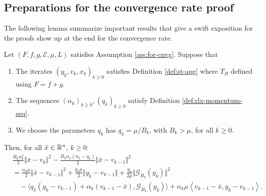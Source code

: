 \documentclass[12pt]{article}
\begin{document}
    \subsection{Preparations for the convergence rate proof}
        The following lemma summarize important results that give a swift exposition for the proofs show up at the end for the convergence rate. 
        \begin{lemma}\label{lemma:cnvg-prep-part1}
            Let $(F, f, g,  \mathcal E, \mu, L)$ satisfies Assumption \ref{ass:for-cnvg}. 
            Suppose that 
            \begin{enumerate}[nosep]
                \item The iterates $(y_k, v_k, x_k)_{k \ge 0}$ satisfies Definition \ref{def:st-apg} where $T_B$ defined using $F = f + g$. 
                \item The sequences $(\alpha_k)_{k\ge 0}, (q_k)_{k \ge 0}$ satisfy Definition \ref{def:rlx-momentum-seq}. 
                \item We choose the parameters $q_k$ has $q_k = \mu/B_k$, with $B_k > \mu$, for all $k \ge 0$. 
            \end{enumerate}
            Then, for all $\bar x \in \mathbb R^n$, $k \ge 0$: 
            \begin{align*}
                & \frac{B_k\alpha_k^2}{2}\Vert \bar x - v_k\Vert^2 
                - \frac{B_k\alpha_k(\alpha_k - q_k)}{2}\Vert \bar x - v_{k - 1}\Vert^2
                \\
                &=
                \frac{\alpha_k \mu}{2}
                \Vert \bar x - v_{k - 1}\Vert^2
                + \frac{q_k\mu}{2}\Vert y_k - v_{k - 1} \Vert
                + \frac{q_k}{2\mu}\Vert \mathcal G_{B_k}(y_k)\Vert^2
                \\ &\quad 
                - \langle
                    q_k(y_k - v_{k - 1}) + \alpha_k(v_{k - 1} - \bar x), \mathcal G_{B_k}(y_k)
                \rangle
                    + \alpha_k \mu
                    \left\langle 
                        v_{k - 1} - \bar x, 
                        y_k - v_{k - 1}
                    \right\rangle. 
            \end{align*}
        \end{lemma}
\end{document}
